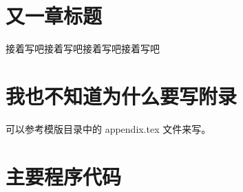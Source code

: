 \documentclass{swfcthesis}
\begin{document}
\chapter{又一章标题}

接着写吧接着写吧接着写吧接着写吧


\Appendix{}
\printbibliography[heading={bibintoc},title={参考文献}] %
\advisorinfopage{}                 %
\acknowledgmentspage{}             %


\chapter{我也不知道为什么要写附录} %

可以参考模版目录中的 appendix.tex 文件来写。

\chapter{主要程序代码} %


\begin{listing}[H]
\end{listing}  
\end{document}
